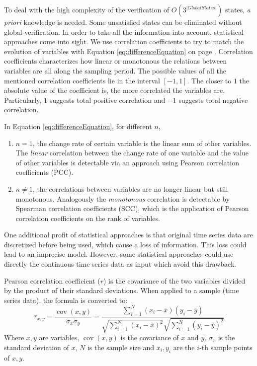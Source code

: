 To deal with the high complexity of the verification of $O(3^{|Global States|})$ states, \textit{a priori} knowledge is needed. 
Some unsatisfied states can be eliminated without global verification.  
In order to take all the information into account, statistical approaches come into sight.
We use correlation coefficients to try to match the evolution of variables with Equation \ref{eq:differenceEquation} on page \pageref{eq:differenceEquation}.
Correlation coefficients characterizes how linear or monotonous the relations between variables are all along the sampling period.
The possible values of all the mentioned correlation coefficients lie in the interval $[-1,1]$.
The closer to $1$ the absolute value of the coefficient is, the more correlated the variables are.
Particularly, $1$ suggests total positive correlation and $-1$ suggests total negative correlation. 

In Equation \ref{eq:differenceEquation}, for different $n$,
\begin{enumerate}
    \item $n=1$, the change rate of certain variable is the linear sum of other variables.
    The \textit{linear} correlation between the change rate of one variable and the value of other variables is detectable via an approach using Pearson correlation coefficients (PCC).
    \item $n\neq 1$, the correlations between variables are no longer linear but still monotonous.
    Analogously the \textit{monotonous} correlation is detectable by Spearman correlation coefficients (SCC), which is the application of Pearson correlation coefficients on the rank of variables.
\end{enumerate}

One additional profit of statistical approaches is that original time series data are discretized before being used, which cause a loss of information.
This loss could lead to an imprecise model.
However, some statistical approaches could use directly the continuous time series data as input which avoid this drawback.

\begin{definition}
    Pearson correlation coefficient ($r$) is the covariance of the two variables divided by the product of their standard deviations.
    When applied to a sample (time series data), the formula is converted to:
    $${\displaystyle r_{x,y}={\frac {\operatorname {cov} (x,y)}{\sigma _{x}\sigma _{y}}}={\frac {\sum _{i=1}^{N}(x_{i}-{\bar {x}})(y_{i}-{\bar {y}})}{{\sqrt {\sum _{i=1}^{N}(x_{i}-{\bar {x}})^{2}}}{\sqrt {\sum _{i=1}^{N}(y_{i}-{\bar {y}})^{2}}}}}}$$
    Where $x,y$ are variables, $\operatorname {cov} (x,y)$ is the covariance of $x$ and $y$, $\sigma _{x}$ is the standard deviation of $x$, $N$ is the sample size and $x_i,y_i$ are the $i$-th sample points of $x,y$.
\end{definition}

